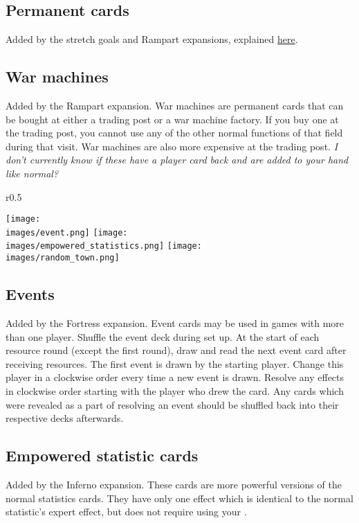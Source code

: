 \documentclass[12pt]{article}
\def\assets{assets}
\def\images{\assets/images}
\def\svgs{\assets/svgs}
\begin{document}
\subsection*{Permanent cards}
Added by the stretch goals and Rampart expansions, explained \hyperlink{Playerdecks}{here}.
\subsection*{War machines}
Added by the Rampart expansion. War machines are permanent cards that can be bought at either a trading post or a war machine factory. If you buy one at the trading post, you cannot use any of the other normal functions of that field during that visit. War machines are also more expensive at the trading post. \textit{I don't currently know if these have a player card back and are added to your hand like normal?}\par

\clearpage
\begin{wrapfigure}{r}{0.5\textwidth}
    \begin{center}
    \texttt{[image: \\images/event.png]}
    \texttt{[image: \\images/empowered\_statistics.png]}
    \texttt{[image: \\images/random\_town.png]}
    \end{center}
\end{wrapfigure}
\subsection*{Events}
Added by the Fortress expansion. Event cards may be used in games with more than one player. Shuffle the event deck during set up. At the start of each resource round (except the first round), draw and read the next event card after receiving resources. The first event is drawn by the starting player. Change this player in a clockwise order every time a new event is drawn. Resolve any effects in clockwise order starting with the player who drew the card. Any cards which were revealed as a part of resolving an event should be shuffled back into their respective decks afterwards.
\subsection*{Empowered statistic cards}
Added by the Inferno expansion. These cards are more powerful versions of the normal statistics cards. They have only one effect which is identical to the normal statistic's expert effect, but does not require using your .
\end{document}
